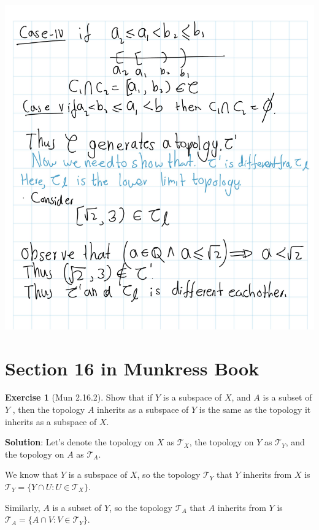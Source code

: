 \documentclass[
]{book}
\theoremstyle{definition}
\theoremstyle{definition}
\theoremstyle{definition}
\newtheorem{exercise}{Exercise}[chapter]
\theoremstyle{definition}
\theoremstyle{remark}
\begin{document}
\includegraphics{figures/Exercises/Ex 2.13/ex-8-3.png}

\hypertarget{section-16-in-munkress-book}{%
\section{Section 16 in Munkress Book}\label{section-16-in-munkress-book}}

\begin{exercise}[Mun 2.16.2]
\protect\hypertarget{exr:unnamed-chunk-117}{}\label{exr:unnamed-chunk-117}Show that if \(Y\) is a subspace of \(X\), and \(A\) is a subset of \(Y\) , then the topology \(A\) inherits as a subspace of \(Y\) is the same as the topology it inherits as a subspace of \(X\).
\end{exercise}

\textbf{Solution}:
Let's denote the topology on \(X\) as \(\mathcal{T}_X\), the topology on \(Y\) as \(\mathcal{T}_Y\), and the topology on \(A\) as \(\mathcal{T}_A\).

We know that \(Y\) is a subspace of \(X\), so the topology \(\mathcal{T}_Y\) that \(Y\) inherits from \(X\) is \(\mathcal{T}_Y = \{ Y \cap U : U \in \mathcal{T}_X \}\).

Similarly, \(A\) is a subset of \(Y\), so the topology \(\mathcal{T}_A\) that \(A\) inherits from \(Y\) is \(\mathcal{T}_A = \{ A \cap V : V \in \mathcal{T}_Y \}\).
\end{document}

